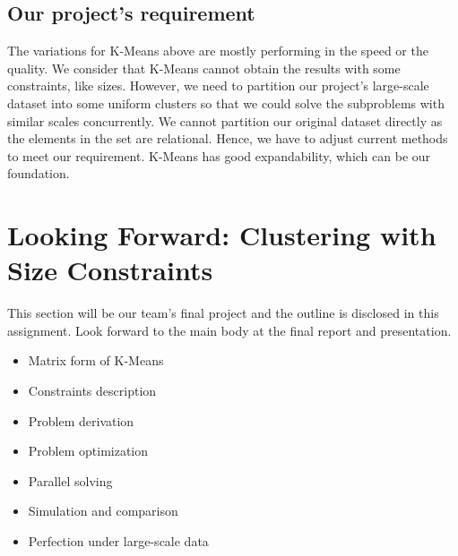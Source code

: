 \documentclass[12pt,a4paper]{article}
\begin{document}
\subsection{Our project's requirement}
The variations for K-Means above are mostly performing in the speed or the quality. We consider that K-Means cannot obtain the results with some constraints, like sizes. However, we need to partition our project's large-scale dataset into some uniform clusters so that we could solve the subproblems with similar scales concurrently. We cannot partition our original dataset directly as the elements in the set are relational. Hence, we have to adjust current methods to meet our requirement. K-Means has good expandability, which can be our foundation.

\section{Looking Forward: Clustering with Size Constraints}
This section will be our team's final project and the outline is disclosed in this assignment. Look forward to the main body at the final report and presentation.

\begin{itemize}
\item Matrix form of K-Means
\item Constraints description
\item Problem derivation
\item Problem optimization
\item Parallel solving
\item Simulation and comparison
\item Perfection under large-scale data
\end{itemize}

\clearpage



\end{document}
